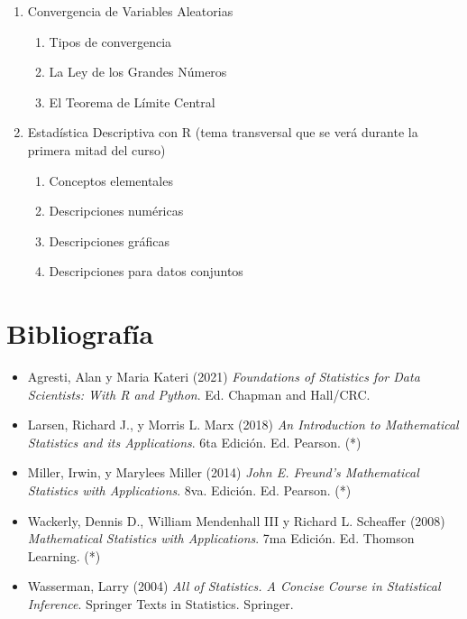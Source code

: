 \documentclass[letterpaper, 12pt]{article}
\begin{document}
\begin{enumerate}
\begin{enumerate}
        \item Desigualdades de Esperanza
    \end{enumerate}
\item Convergencia de Variables Aleatorias
    \begin{enumerate}
        \item Tipos de convergencia
        \item La Ley de los Grandes Números
        \item El Teorema de Límite Central
    \end{enumerate}
\item Estadística Descriptiva con R (tema transversal que se verá durante la primera mitad del curso)
	\begin{enumerate}
    	\item Conceptos elementales
        \item Descripciones numéricas
        \item Descripciones gráficas
        \item Descripciones para datos conjuntos
    \end{enumerate}
\end{enumerate}

\section{Bibliografía}
\begin{itemize}
    \item Agresti, Alan y Maria Kateri (2021) \textit{Foundations of Statistics for Data Scientists: With R and Python}. Ed. Chapman and Hall/CRC.
    
    \item Larsen, Richard J., y Morris L. Marx (2018) \textit{An Introduction to Mathematical Statistics and its Applications}. 6ta Edición. Ed. Pearson. (*) 
    
    \item Miller, Irwin, y Marylees Miller (2014) \textit{John E. Freund's Mathematical Statistics with Applications}. 8va. Edición. Ed. Pearson. (*)
    
    \item Wackerly, Dennis D., William Mendenhall III y Richard L. Scheaffer (2008) \textit{Mathematical Statistics with Applications}. 7ma Edición. Ed. Thomson Learning. (*)
    
    \item Wasserman, Larry (2004) \textit{All of Statistics. A Concise Course in Statistical Inference}. Springer Texts in Statistics. Springer. 
\end{itemize}
\end{document}
